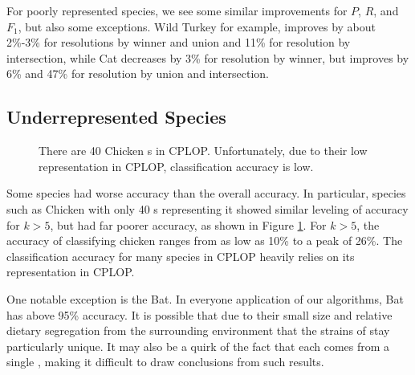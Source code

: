 For poorly represented species, we see some similar improvements for $P$, $R$, and $F_1$, but also some exceptions. Wild Turkey for example, improves by about 2\%-3\% for resolutions by winner and union and 11\% for resolution by intersection, while Cat decreases by 3\% for resolution by winner, but improves by 6\% and 47\% for resolution by union and intersection.

\subsection{Underrepresented Species}
\begin{figure}[t]
\centering
{}
\caption{There are 40 Chicken \isol{}s in CPLOP. Unfortunately, due to their low representation in CPLOP, classification accuracy is low.}
\label{fig:k_chicken}
\end{figure}
Some species had worse accuracy than the overall accuracy. In particular, species such as Chicken with only 40 \isol{}s representing it showed similar leveling of accuracy for $k>5$, but had far poorer accuracy, as shown in Figure \ref{fig:k_chicken}. For $k>5$, the accuracy of classifying chicken ranges from as low as 10\% to a peak of 26\%. The classification accuracy for many species in CPLOP heavily relies on its representation in CPLOP.

One notable exception is the Bat. In everyone application of our \kNN{} algorithms, Bat has above 95\% accuracy. It is possible that due to their small size and relative dietary segregation from the surrounding environment that the strains of \ecoli{} stay particularly unique. It may also be a quirk of the fact that each \isol{} comes from a single \host{}, making it difficult to draw conclusions from such results.